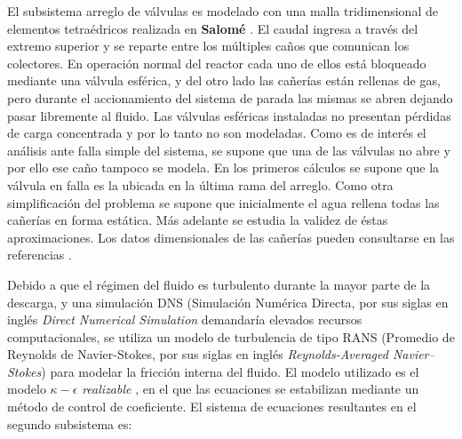 El subsistema arreglo de válvulas es modelado con una malla tridimensional de elementos tetraédricos realizada en \textbf{Salomé} \cite{salome}.
El caudal ingresa a través del extremo superior y se reparte entre los múltiples caños que comunican los colectores.
En operación normal del reactor cada uno de ellos está bloqueado mediante una válvula esférica,
y del otro lado las cañerías están rellenas de gas,
pero durante el accionamiento del sistema de parada las mismas se abren dejando pasar libremente al fluido.
Las válvulas esféricas instaladas no presentan pérdidas de carga concentrada y por lo tanto no son modeladas.
Como es de interés el análisis ante falla simple del sistema,
se supone que una de las válvulas no abre y por ello ese caño tampoco se modela.
En los primeros cálculos se supone que la válvula en falla es la ubicada en la última rama del arreglo.
Como otra simplificación del problema se supone que inicialmente el agua rellena todas las cañerías en forma estática.
Más adelante se estudia la validez de éstas aproximaciones.
Los datos dimensionales de las cañerías pueden consultarse en las referencias \cite{invap-mockup}.

Debido a que el régimen del fluido es turbulento durante la mayor parte de la descarga,
y una simulación DNS (Simulación Numérica Directa, por sus siglas en inglés \textit{Direct Numerical Simulation} demandaría elevados recursos computacionales,
se utiliza un modelo de turbulencia de tipo RANS (Promedio de Reynolds de Navier-Stokes, por sus siglas en inglés \textit{Reynolds-Averaged Navier–Stokes})
para modelar la fricción interna del fluido.
El modelo utilizado es el modelo $\kappa-\epsilon$ \textit{realizable} \cite{k-e-realizable},
en el que las ecuaciones se estabilizan mediante un método de control de coeficiente.
El sistema de ecuaciones resultantes en el segundo subsistema es:

